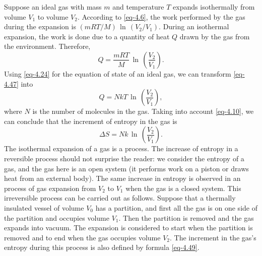  Suppose an ideal gas with mass $m$ and temperature $T$ expands isothermally from volume $V_{1}$ to volume $V_{2}$. According to \eqref{eq-4.6}, the work performed by the gas during the expansion is $(mRT/ M) \, \ln \,(V_{2}/ V_{1})$. During an isothermal expansion, the work is done due to a quantity of heat $Q$ drawn by the gas from the environment. Therefore,
\begin{equation}%
Q =	\frac{mRT}{M} \, \ln \, \left( \frac{V_{2}}{V_{1}} \right).
\label{eq-4.47}
\end{equation}
Using \eqref{eq-4.24} for the equation of state of an ideal gas, we can transform \eqref{eq-4.47} into
\begin{equation}%
Q =	N k T \, \ln \, \left( \frac{V_{2}}{V_{1}} \right),
\label{eq-4.48}
\end{equation}
where $N$ is the number of molecules in the gas. Taking into account \eqref{eq-4.10}, we can conclude that the increment of entropy in the gas is
\begin{equation}%
\Delta S =	N k \, \ln \, \left( \frac{V_{2}}{V_{1}} \right).
\label{eq-4.49}
\end{equation}
The isothermal expansion of a gas is a  process. The increase of entropy in a reversible process should not surprise the reader: we consider the entropy of a gas, and the gas here is an open system (it performs work on a piston or draws heat from an external body). The same increase in entropy is observed in an  process of gas expansion from $V_{2}$ to $V_{1}$ when the gas is a closed system. This irreversible process can be carried out as follows. Suppose that a thermally insulated vessel of volume $V_{0}$ has a partition, and first all the gas is on one side of the partition and occupies volume $V_{1}$. Then the partition is removed and the gas expands into vacuum. The expansion is considered to start when the partition is removed and to end when the gas occupies volume $V_{2}$. The increment in the gas's entropy during this process is also defined by formula \eqref{eq-4.49}.

